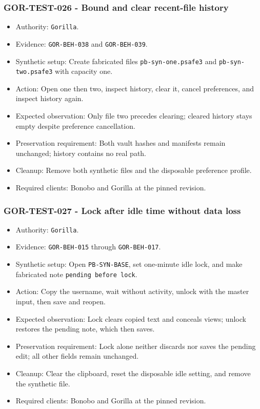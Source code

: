 \documentclass[
  letterpaper,
]{article}
\newcommand{\passthrough}[1]{#1}
\providecommand{\tightlist}{%
  \setlength{\itemsep}{0pt}\setlength{\parskip}{0pt}}
\begin{document}
\subsubsection{GOR-TEST-026 - Bound and clear recent-file
history}\label{gor-test-026---bound-and-clear-recent-file-history}

\begin{itemize}
\tightlist
\item
  Authority: \passthrough{\lstinline!Gorilla!}.
\item
  Evidence: \nolinkurl{GOR-BEH-038} and \nolinkurl{GOR-BEH-039}.
\item
  Synthetic setup: Create fabricated files \nolinkurl{pb-syn-one.psafe3} and \nolinkurl{pb-syn-two.psafe3} with capacity
  one.
\item
  Action: Open one then two, inspect history, clear it, cancel preferences, and inspect history again.
\item
  Expected observation: Only file two precedes clearing; cleared history stays empty despite preference cancellation.
\item
  Preservation requirement: Both vault hashes and manifests remain unchanged; history contains no real path.
\item
  Cleanup: Remove both synthetic files and the disposable preference profile.
\item
  Required clients: Bonobo and Gorilla at the pinned revision.
\end{itemize}

\subsubsection{GOR-TEST-027 - Lock after idle time without data
loss}\label{gor-test-027---lock-after-idle-time-without-data-loss}

\begin{itemize}
\tightlist
\item
  Authority: \passthrough{\lstinline!Gorilla!}.
\item
  Evidence: \nolinkurl{GOR-BEH-015} through \nolinkurl{GOR-BEH-017}.
\item
  Synthetic setup: Open \nolinkurl{PB-SYN-BASE}, set one-minute idle lock, and make fabricated note
  \passthrough{\lstinline!pending before lock!}.
\item
  Action: Copy the username, wait without activity, unlock with the master input, then save and reopen.
\item
  Expected observation: Lock clears copied text and conceals views; unlock restores the pending note, which then saves.
\item
  Preservation requirement: Lock alone neither discards nor saves the pending edit; all other fields remain unchanged.
\item
  Cleanup: Clear the clipboard, reset the disposable idle setting, and remove the synthetic file.
\item
  Required clients: Bonobo and Gorilla at the pinned revision.
\end{itemize}
\end{document}
